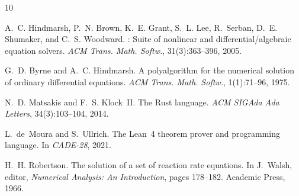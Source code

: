 \documentclass[manuscript,screen,review]{acmart}
\begin{document}

\begin{thebibliography}{10}

A.~C. Hindmarsh, P.~N. Brown, K.~E. Grant, S.~L. Lee, R.~Serban, D.~E. Shumaker, and C.~S. Woodward.
: Suite of nonlinear and differential/algebraic equation solvers.
\newblock \emph{ACM Trans. Math. Softw.}, 31(3):363--396, 2005.

G.~D. Byrne and A.~C. Hindmarsh.
\newblock A polyalgorithm for the numerical solution of ordinary differential equations.
\newblock \emph{ACM Trans. Math. Softw.}, 1(1):71--96, 1975.

N.~D. Matsakis and F.~S. Klock~II.
\newblock The {R}ust language.
\newblock \emph{ACM SIGAda Ada Letters}, 34(3):103--104, 2014.

L.~de~Moura and S.~Ullrich.
\newblock The {L}ean~4 theorem prover and programming language.
\newblock In \emph{CADE-28}, 2021.

H.~H. Robertson.
\newblock The solution of a set of reaction rate equations.
\newblock In J.~Walsh, editor, \emph{Numerical Analysis: An Introduction}, pages 178--182. Academic Press, 1966.

\end{thebibliography}
\end{document}
